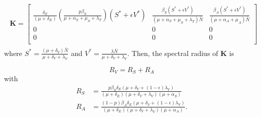 \begin{align}\label{NGM1}
    \begin{split}
        \textbf{K}=
        \begin{bmatrix}
            \frac{\delta_E}{(\mu + \delta_E)}
            \left(\frac{p\beta_S}{\mu + \alpha_S + \mu_S + \lambda_T} \right)
            (S^* + \epsilon V^*)
            & \frac{\beta_S (S^* + \epsilon V^*)}{(\mu + \alpha_S + \mu_S +
            \lambda_T)\bar{N}}
            & \frac{\beta_A (S^* + \epsilon V^*)}{(\mu + \alpha_A + \mu_A)
            \bar{N}}
            \\
            0 & 0 & 0 \\
            0 & 0 & 0  \\
        \end{bmatrix}
    \end{split}
\end{align}
where $S^*=\frac{(\mu+\delta_V)\bar{N}}{\mu+\delta_V+\lambda_V}$
and $V^*=\frac{\lambda \bar{N}}{\mu+\delta_V+\lambda_V}$. Then, the spectral
radius of \textbf{K} is

\begin{equation*}
    R_{V}=R_S+R_A
\end{equation*}
with
\begin{align*}
    R_S &= \frac{p\beta_S\delta_E(\mu+\delta_V+(1-\epsilon)
        \lambda_V)}{(\mu+\delta_E)(\mu+\delta_V+\lambda_V)(\mu+\alpha_S)}
    \\
    R_A &= \frac{(1-p) \beta_A \delta_E (\mu + \delta_V + (1-\epsilon)
        \lambda_V)}{(\mu+\delta_E)(\mu + \delta_V + \lambda_V)(\mu + \alpha_A
        )}.
\end{align*}




